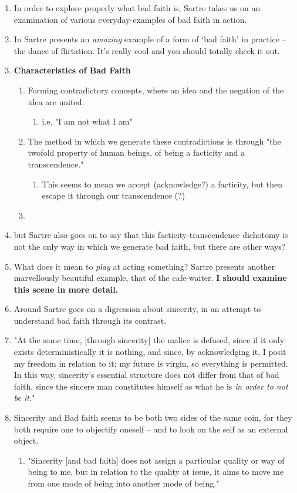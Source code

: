 \begin{enumerate}
  \item In order to explore properly what bad faith is, Sartre takes us on an examination of various everyday-examples of bad faith in action.
  \item In \autocite[98]{sartre} Sartre presents an \emph{amazing} example of a form of `bad faith' in practice -- the dance of flirtation. It's really cool and you should totally check it out.
  \item \textbf{Characteristics of Bad Faith}
  \begin{enumerate}
    \item Forming contradictory concepts, where an idea and the negation of the idea are united.
    \begin{enumerate}
      \item i.e. "I am not what I am"
    \end{enumerate}
    \item The method in which we generate these contradictions is through "the twofold property of human beings, of being a facticity and a transcendence." \autocite[99]{sartre}
    \begin{enumerate}
      \item This seems to mean we accept (acknowledge?) a facticity, but then escape it through our transcendence (?)
    \end{enumerate}
    \item
  \end{enumerate}
  \item but Sartre also goes on to say that this facticity-transcendence dichotomy is not the only way in which we generate bad faith, but there are other ways?
  \item \autocite[102]{sartre} What does it mean to \emph{play} at acting something? Sartre presents another marvellously beautiful example, that of the cafe-waiter. \textbf{I should examine this scene in more detail.}
  \item Around \autocite[109]{sartre} Sartre goes on a digression about sincerity, in an attempt to understand bad faith through its contrast.
  \item "At the same time, [through sincerity] the malice is defused, since if it only exists deterministically it is nothing, and since, by acknowledging it, I posit my freedom in relation to it; my future is virgin, so everything is permitted. In this way, sincerity's essential structure does not differ from that of bad faith, since the sincere man constitutes himself as what he is \emph{in order to not be it.}" \autocite[110]{sartre}
  \item Sincerity and Bad faith seems to be both two sides of the same coin, for they both require one to objectify oneself -- and to look on the self as an external object.
  \begin{enumerate}
    \item "Sincerity [and bad faith] does not assign a particular quality or way of being to me, but in relation to the quality at issue, it aims to move me from one mode of being into another mode of being." \autocite[111]{sartre}
  \end{enumerate}
\end{enumerate}

